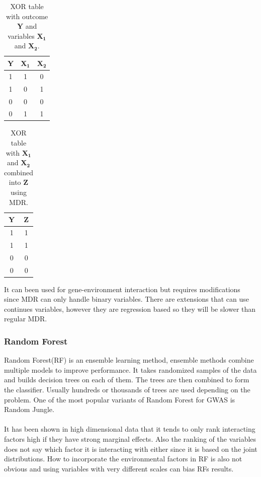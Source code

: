 \documentclass[10pt,a4paper]{report}
\begin{document}
\begin{table}[h]
\begin{tabular}{ | c | c | c | }
  \hline
  \textbf{Y} & $\mathbf{X_1}$ & $\mathbf{X_2}$ \\
  \hline
  1 & 1 & 0 \\
  \hline 
  1 & 0 & 1 \\
  \hline
  0 & 0 & 0 \\
  \hline
  0 & 1 & 1 \\
  \hline
\end{tabular}
\caption{XOR table with outcome $\mathbf{Y}$ and variables $\mathbf{X_1}$ and $\mathbf{X_2}$.}
\label{table:xor_table}
\end{table}
\begin{table}[h]
\begin{tabular}{ | c | c | }
  \hline
  \textbf{Y} & \textbf{Z} \\
  \hline
  1 & 1 \\
  \hline
  1 & 1 \\
  \hline
  0 & 0 \\
  \hline
  0 & 0 \\
  \hline
\end{tabular}
\caption{XOR table with $\mathbf{X_1}$ and $\mathbf{X_2}$ combined into $\mathbf{Z}$ using MDR.}
\label{table:xor_mdr_table}
\end{table}

It can been used for gene-environment interaction but requires modifications since MDR can only handle binary variables. There are extensions that can use continues variables, however they are regression based so they will be slower than regular MDR.\cite{gene_enviroment_2013}

\subsubsection{Random Forest}
Random Forest(RF) is an ensemble learning method, ensemble methods combine multiple models to improve performance. It takes randomized samples of the data and builds decision trees on each of them. The trees are then combined to form the classifier. Usually hundreds or thousands of trees are used depending on the problem\cite{random_forest}. One of the most popular variants of Random Forest for GWAS is Random Jungle\cite{random_jungle}.\\
\\
It has been shown in high dimensional data that it tends to only rank interacting factors high if they have strong marginal effects\cite{winham_rf_2012}. Also the ranking of the variables does not say which factor it is interacting with either since it is based on the joint distributions\cite{gene_enviroment_2013}. How to incorporate the environmental factors in RF is also not obvious and using variables with very different scales can bias RFs results\cite{gene_enviroment_2013}.
\end{document}
